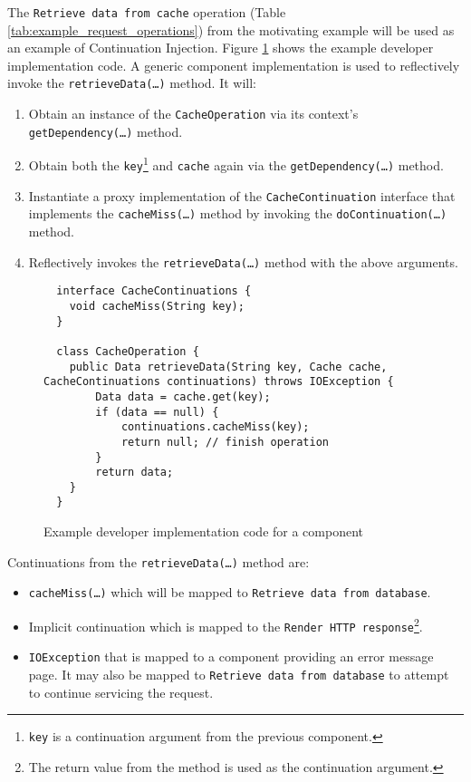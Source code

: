 \documentclass[prodmode]{style/acmlarge}
\begin{document}
The \texttt{Retrieve data from cache} operation (Table
\ref{tab:example_request_operations}) from the motivating example will be used
as an example of Continuation Injection.  Figure
\ref{fig:Example_Method_Operation} shows the example developer implementation
code.  A generic component implementation is used to reflectively invoke the
\texttt{retrieveData(\ldots)} method. It will:
\begin{enumerate}
  \item Obtain an instance of the \texttt{CacheOperation} via its context's \texttt{getDependency(\ldots)} method.
  \item Obtain both the \texttt{key}\footnote{\texttt{key} is a continuation argument from the previous component.} and \texttt{cache} again via the \texttt{getDependency(\ldots)} method.
  \item Instantiate a proxy implementation of the \texttt{CacheContinuation} interface that implements the \texttt{cacheMiss(\ldots)} method by invoking the \texttt{doContinuation(\ldots)} method. 
  \item Reflectively invokes the \texttt{retrieveData(\ldots)} method with the above arguments.
\end{enumerate}

\begin{figure}[tp]
\centering
\begin{verbatim}
  interface CacheContinuations {
    void cacheMiss(String key);
  }

  class CacheOperation {    
    public Data retrieveData(String key, Cache cache, CacheContinuations continuations) throws IOException {
        Data data = cache.get(key);
        if (data == null) {
            continuations.cacheMiss(key);
            return null; // finish operation
        }
        return data;
    }
  }
\end{verbatim}
\caption{Example developer implementation code for a component\footnotemark}
\label{fig:Example_Method_Operation}
\end{figure}

Continuations from the \texttt{retrieveData(\ldots)} method are:
\begin{itemize}
  \item \texttt{cacheMiss(\ldots)} which will be mapped to \texttt{Retrieve data from database}.
  \item Implicit continuation which is mapped to the \texttt{Render HTTP response}\footnote{The return value from the method is used as the continuation argument.}.
  \item \texttt{IOException} that is mapped to a component providing an error message page.  It may also be mapped to \texttt{Retrieve data from database} to attempt to continue servicing the request.
\end{itemize}
\end{document}
